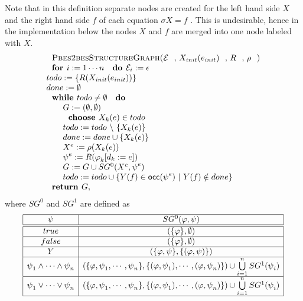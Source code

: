 Note that in this definition separate nodes are created for the left hand
side $X$ and the right hand side $f$ of each equation $\sigma X=f$ . This is
undesirable, hence in the implementation below the nodes $X$ and $f$ are
merged into one node labeled with $X$.%
\begin{equation*}
\begin{array}{l}
\text{\textsc{Pbes2besStructureGraph(}}\mathcal{E}\text{, }X_{init}(e_{init})%
\text{, }R\text{, }\rho \text{\textsc{)}} \\ 
\text{\textbf{for }}i:=1\cdots n\text{ \textbf{do }}\mathcal{E}%
_{i}:=\epsilon  \\ 
todo:=\{R(X_{init}(e_{init}))\} \\ 
done:=\emptyset  \\ 
\text{\textbf{while }}todo\neq \emptyset \text{ \textbf{do}} \\ 
\qquad G:=(\emptyset ,\emptyset ) \\ 
\qquad \text{\textbf{choose }}X_{k}(e)\in todo \\ 
\qquad todo:=todo\ \backslash \ \{X_{k}(e)\} \\ 
\qquad done:=done\cup \{X_{k}(e)\} \\ 
\qquad X^{e}:=\rho (X_{k}(e)) \\ 
\qquad \psi ^{e}:=R(\varphi _{k}[d_{k}:=e]) \\ 
\qquad G:=G\cup SG^{0}(X^{e},\psi ^{e}) \\ 
\qquad todo:=todo\cup \{Y(f)\in \mathsf{occ}(\psi ^{e})\ |\ Y(f)\notin done\}
\\ 
\text{\textbf{return }}G,%
\end{array}%
\end{equation*}%
where $SG^{0}$ and $SG^{1}$ are defined as%
\begin{equation*}
\begin{array}{|c|c|}
\hline
\psi  & SG^{0}(\varphi ,\psi ) \\ \hline\hline
true & (\{\varphi \},\emptyset ) \\ \hline
false & (\{\varphi \},\emptyset ) \\ \hline
Y & (\{\varphi ,\psi \},\{(\varphi ,\psi )\}) \\ \hline
\psi _{1}\wedge \cdots \wedge \psi _{n} & \left( \{\varphi ,\psi _{1},\cdots
,\psi _{n}\},\{(\varphi ,\psi _{1}),\cdots ,(\varphi ,\psi _{n})\}\right)
\cup \bigcup\limits_{i=1}^{n}SG^{1}(\psi _{i}) \\ \hline
\psi _{1}\vee \cdots \vee \psi _{n} & \left( \{\varphi ,\psi _{1},\cdots
,\psi _{n}\},\{(\varphi ,\psi _{1}),\cdots ,(\varphi ,\psi _{n})\}\right)
\cup \bigcup\limits_{i=1}^{n}SG^{1}(\psi _{i}) \\ \hline
\end{array}%
\end{equation*}%
